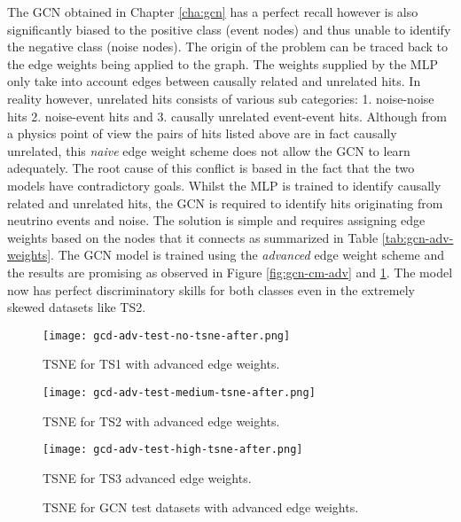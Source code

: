 The GCN obtained in Chapter \ref{cha:gcn} has a perfect recall however
is also significantly biased to the positive class (event nodes) and
thus unable to identify the negative class (noise nodes). The origin
of the problem can be traced back to the edge weights being applied to
the graph. The weights supplied by the MLP only take into account
edges between causally related and unrelated hits. In reality however,
unrelated hits consists of various sub categories: 1. noise-noise hits
2. noise-event hits and 3. causally unrelated event-event hits.
Although from a physics point of view the pairs of hits listed above
are in fact causally unrelated, this \emph{naive} edge weight scheme
does not allow the GCN to learn adequately. The root cause of this
conflict is based in the fact that the two models have contradictory
goals. Whilst the MLP is trained to identify causally related and
unrelated hits, the GCN is required to identify hits originating from
neutrino events and noise. The solution is simple and requires
assigning edge weights based on the nodes that it connects as
summarized in Table \ref{tab:gcn-adv-weights}. The GCN model is
trained using the \emph{advanced} edge weight scheme and the results
are promising as observed in Figure \ref{fig:gcn-cm-adv} and
\ref{fig:gcn-test-tsne-adv}. The model now has perfect discriminatory
skills for both classes even in the extremely skewed datasets like
TS2.

\begin{figure}[htb]
  \begin{minipage}{0.32\textwidth}
    \centering
    \texttt{[image: gcd-adv-test-no-tsne-after.png]}
    \caption{TSNE for TS1 with advanced edge weights.}
  \end{minipage}
  \begin{minipage}{0.32\textwidth}
    \centering
    \texttt{[image: gcd-adv-test-medium-tsne-after.png]}
    \caption{TSNE for TS2 with advanced edge weights.}
  \end{minipage}
  \begin{minipage}{0.32\textwidth}
    \centering
    \texttt{[image: gcd-adv-test-high-tsne-after.png]}
    \caption{TSNE for TS3 advanced edge weights.}
  \end{minipage}
  \caption{TSNE for GCN test datasets with advanced edge weights.}
  \label{fig:gcn-test-tsne-adv}
\end{figure}

